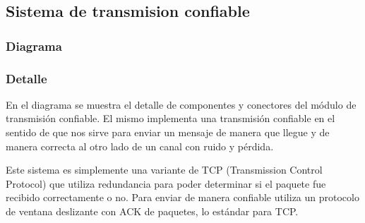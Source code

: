 \subsection{Sistema de transmision confiable}
\subsubsection{Diagrama}


\subsubsection{Detalle}

En el diagrama se muestra el detalle de componentes y conectores del
módulo de transmisión confiable. El mismo implementa una transmisión
confiable en el sentido de que nos sirve para enviar un mensaje de
manera que llegue y de manera correcta al otro lado de un canal con
ruido y pérdida.

Este sistema es simplemente una variante de TCP (Transmission
Control Protocol) que utiliza redundancia para poder determinar si
el paquete fue recibido correctamente o no. Para enviar de manera
confiable utiliza un protocolo de ventana deslizante con ACK de 
paquetes, lo estándar para TCP.
